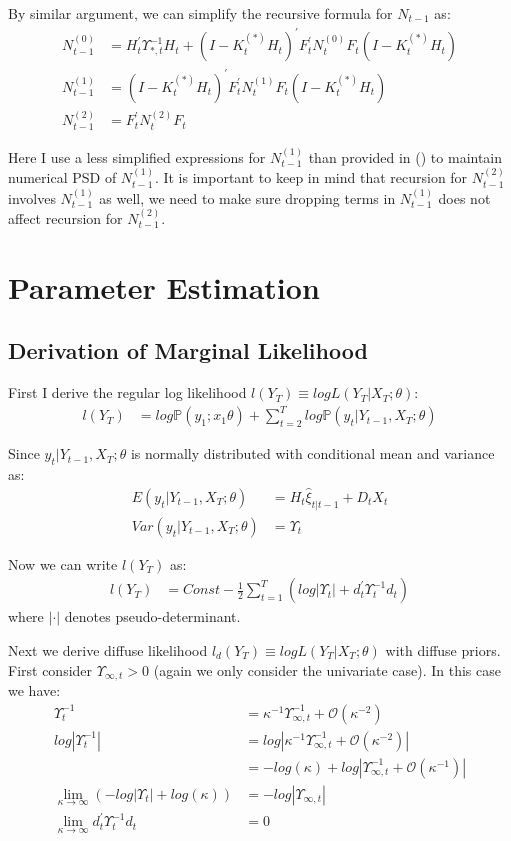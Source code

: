 \documentclass[10pt]{article}
\numberwithin{equation}{section}
\begin{document}
By similar argument, we can simplify the recursive formula for $N_{t-1}$ as: 
\begin{align}
    N_{t-1}^{(0)} &= H_t^{'}\Upsilon_{*,t}^{-1}H_t+(I-K_t^{(*)}H_t)^{'}F_t^{'}N_t^{(0)}F_t(I-K_t^{(*)}H_t) \label{eq:N_0_start} \\
    N_{t-1}^{(1)} &= (I-K_t^{(*)}H_t)^{'}F_t^{'}N_t^{(1)}F_t(I-K_t^{(*)}H_t) \\
    N_{t-1}^{(2)} &= F_t^{'}N_t^{(2)}F_t \label{eq:N_0_end}
\end{align}

Here I use a less simplified expressions for $N_{t-1}^{(1)}$ than provided in (\cite{durbin_koopman_2003}) to maintain numerical PSD of $N_{t-1}^{(1)}$. It is important to keep in mind that recursion for $N_{t-1}^{(2)}$ involves $N_{t-1}^{(1)}$ as well, we need to make sure dropping terms in $N_{t-1}^{(1)}$ does not affect recursion for $N_{t-1}^{(2)}$. 

\section{Parameter Estimation}
\subsection{Derivation of Marginal Likelihood} \label{ap:NL}
First I derive the regular log likelihood $l(Y_T)\equiv logL(Y_T|X_T;\theta)$: 
\begin{align*}
    l(Y_T) &= log\mathbb{P}(y_1;x_1\theta) + \sum_{t=2}^Tlog\mathbb{P}(y_t|Y_{t-1},X_T;\theta)
\end{align*}

Since $y_t|Y_{t-1},X_T;\theta$ is normally distributed with conditional mean and variance as:
\begin{align*}
    E(y_t|Y_{t-1},X_T;\theta) &= H_t\hat{\xi}_{t|t-1} + D_tX_t \\
    Var(y_t|Y_{t-1},X_T;\theta) &= \Upsilon_t
\end{align*}

Now we can write $l(Y_T)$ as:
\begin{align*}
    l(Y_T) &= Const - \frac{1}{2}\sum_{t=1}^T(log|\Upsilon_t| + d_t^{'}\Upsilon_t^{-1}d_t)
\end{align*}
where $|\cdot|$ denotes pseudo-determinant.

Next we derive diffuse likelihood $l_d(Y_T)\equiv logL(Y_T|X_T;\theta)$ with diffuse priors. First consider $\Upsilon_{\infty,t}>0$ (again we only consider the univariate case). In this case we have:
\begin{align*}
    \Upsilon_t^{-1} &= \kappa^{-1}\Upsilon_{\infty,t}^{-1}+\mathcal{O}(\kappa^{-2}) \\
    log|\Upsilon_t^{-1}| &= log|\kappa^{-1}\Upsilon_{\infty,t}^{-1}+\mathcal{O}(\kappa^{-2})| \\
    &=-log(\kappa) + log|\Upsilon_{\infty,t}^{-1}+\mathcal{O}(\kappa^{-1})| \\
    \lim_{\kappa\rightarrow \infty}(-log|\Upsilon_t| + log(\kappa)) &= -log|\Upsilon_{\infty,t}| \\
    \lim_{\kappa\rightarrow \infty}d_t^{'}\Upsilon_t^{-1}d_t &= 0
\end{align*}
\end{document}
